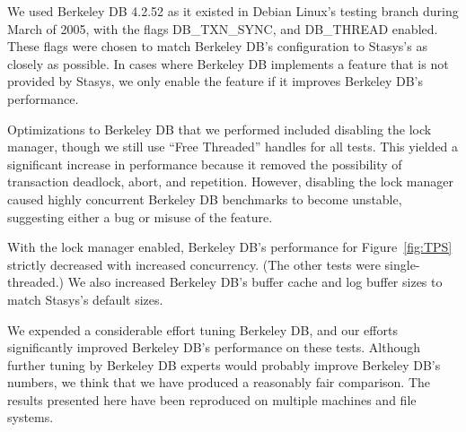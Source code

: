 \documentclass[letterpaper,twocolumn,10pt]{article}
\newcommand{\yad}{Stasys\xspace}
\begin{document}
We used Berkeley DB 4.2.52 as it existed in Debian Linux's testing
branch during March of 2005, with the flags DB\_TXN\_SYNC, and
DB\_THREAD enabled. These flags were chosen to match Berkeley DB's
configuration to \yad's as closely as possible.  In cases where
Berkeley DB implements a feature that is not provided by \yad, we
only enable the feature if it improves Berkeley DB's performance.

Optimizations to Berkeley DB that we performed included disabling the
lock manager, though we still use ``Free Threaded'' handles for all
tests.  This yielded a significant increase in performance because it
removed the possibility of transaction deadlock, abort, and
repetition.  However, disabling the lock manager caused highly
concurrent Berkeley DB benchmarks to become unstable, suggesting either a
bug or misuse of the feature.  

With the lock manager enabled, Berkeley
DB's performance for Figure~\ref{fig:TPS} strictly decreased with
increased concurrency.  (The other tests were single-threaded.)  We also
increased Berkeley DB's buffer cache and log buffer sizes to match
\yad's default sizes.

We expended a considerable effort tuning Berkeley DB, and our efforts
significantly improved Berkeley DB's performance on these tests.
Although further tuning by Berkeley DB experts would probably improve
Berkeley DB's numbers, we think that we have produced a reasonably
fair comparison.  The results presented here have been reproduced on
multiple machines and file systems.
\end{document}
